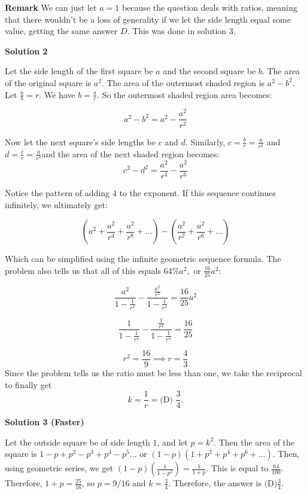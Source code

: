 \begin{enumerate}
 \textbf{Remark} We can just let $a=1$ because the question deals with ratios, meaning that there wouldn't be a loss of generality if we let the side length equal some value, getting the same answer $\boxed{D}$. This was done in solution 3.

 



\textbf{Solution 2}

Let the side length of the first square be $a$ and the second square be $b$. The area of the original square is $a^2.$ The area of the outermost shaded region is $a^2 - b^2.$ Let $\frac{a}{b} = r.$ We have $b = \frac{a}{r}.$ So the outermost shaded region area becomes: 

 
 \[a^2 - b^2 = a^2 - \frac{a^2}{r^2}\]

 Now let the next square's side lengths be $c$ and $d.$ Similarly, $c = \frac{b}{r} = \frac{a}{r^2}$ and $d = \frac{c}{r} = \frac{a}{r^3}$and the area of the next shaded region becomes: 
 \[c^2 - d^2 = \frac{a^2}{r^4} - \frac{a^2}{r^6}\] 

 Notice the pattern of adding $4$ to the exponent. If this sequence continues infinitely, we ultimately get: 

 
 \[(a^2 + \frac{a^2}{r^4} + \frac{a^2}{r^8} + ...) - (\frac{a^2}{r^2} + \frac{a^2}{r^6} + ...)\] 

 Which can be simplified using the infinite geometric sequence formula. The problem also tells us that all of this equals $64\% a^2,$ or $\frac{16}{25}a^2:$

 \[\frac{a^2}{1 - \frac{1}{r^4}} - \frac{\frac{a^2}{r^2}}{1 - \frac{1}{r^4}} = \frac{16}{25}a^2\]

 \[\frac{1}{1 - \frac{1}{r^4}} - \frac{\frac{1}{r^2}}{1 - \frac{1}{r^4}} = \frac{16}{25}\]

 \[r^2 = \frac{16}{9} \implies r = \frac{4}{3}\] Since the problem tells us the ratio must be less than one, we take the reciprocal to finally get  
 \[k = \frac{1}{r} = \boxed{\text{(D) }\dfrac{3}{4}}.\]




\textbf{Solution 3 (Faster)}

Let the outside square be of side length $1$, and let $p = k^2$. Then the area of the square is $1-p+p^{2}-p^{3}+p^{4}-p^{5} \dots$ or $\left(1-p\right)\left(1+p^{2}+p^{4}+p^{6}+\dots\right)$. Then, using geometric series, we get $\left(1-p\right)\left(\frac{1}{1-p^{2}}\right) = \frac{1}{1+p}$. This is equal to $\frac{64}{100}$. Therefore, $1+p=\frac{25}{16}$, so $p = 9/16$ and $k = \frac{3}{4}$. Therefore, the answer is $\boxed{\text{(D)}\frac{3}{4}}.$





\end{enumerate}

